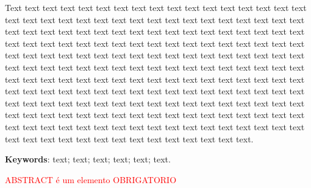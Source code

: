 \begin{resumo}[Abstract]
Text text text text text text text text text text text text text text text text text text text text text text text text text text text text text text text text text text text text text text text text text text text text text text text text text text text text text text text text text text text text text text text text text text text text text text text text text text text text text text text text text text text text text text text text text text text text text text text text text text text text text text text text text text text text text text text text text text text text text text text text text text text text text text text text text text text text text text text text text text text text text text text text text text text text text text text text text text text text text text text text text text text text text text text text text text text text text text text text text text text text text text text text text text text text text text text text text text text text text text text text text.

 \vspace{\onelineskip}
    
 \noindent
 \textbf{Keywords}: text; text; text; text; text; text.

  \textcolor{red}{ABSTRACT é um elemento OBRIGATORIO}
  
\end{resumo}